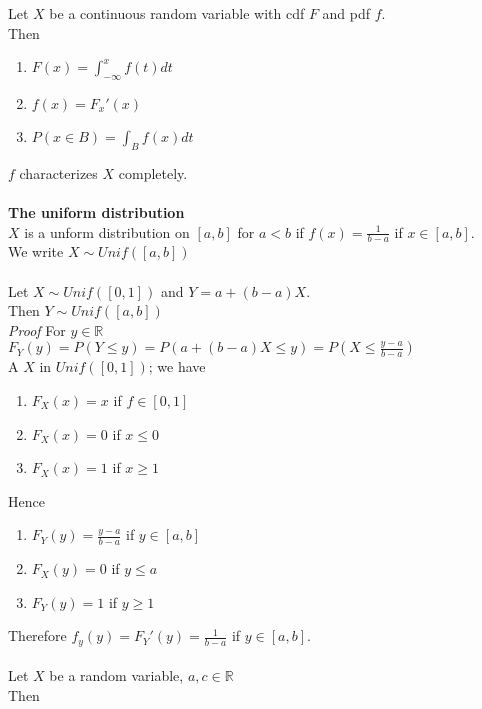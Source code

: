 \documentclass[12pt,a4paper,final]{report}
\begin{document}
Let $X$ be a continuous random variable with cdf $F$ and pdf $f$.\\
Then
\begin{enumerate}
\item $F(x)=\int_{-\infty}^{x} f(t) dt$
\item $f(x)=F_x'(x)$
\item $P(x\in B)=\int_B f(x)dt$
\end{enumerate}
$f$ characterizes $X$ completely.\\\\
\textbf{The uniform distribution}\\
$X$ is a unform distribution on $[a,b]$ for $a<b$ if $f(x)=\frac{1}{b-a}$ if $x\in [a,b]$.\\
We write $X\sim Unif([a,b])$\\\\
Let $X\sim Unif([0,1])$ and $Y=a+(b-a)X$.\\
Then $Y\sim Unif([a,b])$\\
\textit{Proof} For $y\in\mathbb{R}$\\
$F_Y(y)=P(Y\leq y)=P(a+(b-a)X\leq y)=P(X\leq\frac{y-a}{b-a})$\\
A $X$ in $Unif([0,1])$; we have
\begin{enumerate}
\item $F_X(x)=x$ if $f\in [0,1]$
\item $F_X(x)=0$ if $x\leq 0$
\item $F_X(x)=1$ if $x\geq 1$
\end{enumerate}
Hence
\begin{enumerate}
\item $F_Y(y)=\frac{y-a}{b-a}$ if $y\in [a,b]$
\item $F_X(y)=0$ if $y\leq a$
\item $F_Y(y)=1$ if $y\geq 1$
\end{enumerate}
Therefore $f_y(y)=F_Y'(y)=\frac{1}{b-a}$ if $y\in [a,b]$.\\\\
Let $X$ be a random variable, $a,c\in\mathbb{R}$\\
Then
\end{document}
